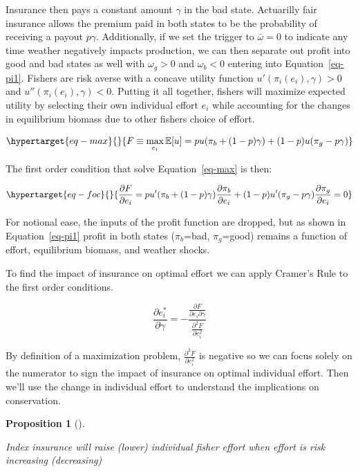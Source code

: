 \documentclass[
  letterpaper,
  DIV=11,
  numbers=noendperiod]{scrartcl}
\theoremstyle{plain}
\theoremstyle{plain}
\newtheorem{proposition}{Proposition}[section]
\theoremstyle{remark}
\begin{document}
Insurance then pays a constant amount \(\gamma\) in the bad state.
Actuarilly fair insurance allows the premium paid in both states to be
the probability of receiving a payout \(p\gamma\). Additionally, if we
set the trigger to \(\bar\omega=0\) to indicate any time weather
negatively impacts production, we can then separate out profit into good
and bad states as well with \(\omega_g>0\) and \(\omega_b<0\) entering
into Equation~\ref{eq-pi1}. Fishers are risk averse with a concave
utility function \(u'(\pi_i(e_i),\gamma)>0\) and
\(u''(\pi_i(e_i),\gamma)<0\). Putting it all together, fishers will
maximize expected utility by selecting their own individual effort
\(e_i\) while accounting for the changes in equilibrium biomass due to
other fishers choice of effort.

\begin{equation}\protect\hypertarget{eq-max}{}{
F\equiv\max_{e_i}\mathbb{E}[u]=pu(\pi_b+(1-p)\gamma)+(1-p)u(\pi_g-p\gamma)
}\label{eq-max}\end{equation}

The first order condition that solve Equation~\ref{eq-max} is then:

\begin{equation}\protect\hypertarget{eq-foc}{}{
\frac{\partial F}{\partial e_i}=pu'(\pi_b+(1-p)\gamma)\frac{\partial \pi_b}{\partial e_i}+(1-p)u'(\pi_g-p\gamma)\frac{\partial \pi_g}{\partial e_i}=0
}\label{eq-foc}\end{equation}

For notional ease, the inputs of the profit function are dropped, but as
shown in Equation~\ref{eq-pi1} profit in both states (\(\pi_b\)=bad,
\(\pi_g\)=good) remains a function of effort, equilibrium biomass, and
weather shocks.

To find the impact of insurance on optimal effort we can apply Cramer's
Rule to the first order conditions.

\[
\frac{\partial e_i^*}{\partial \gamma}=-\frac{\frac{\partial F}{\partial e_i \partial \gamma}}{\frac{\partial^2 F}{\partial e_i^2}}
\]

By definition of a maximization problem,
\(\frac{\partial^2 F}{\partial e_i^2}\) is negative so we can focus
solely on the numerator to sign the impact of insurance on optimal
individual effort. Then we'll use the change in individual effort to
understand the implications on conservation.

\begin{proposition}[]\protect\hypertarget{prp-cp}{}\label{prp-cp}

Index insurance will raise (lower) individual fisher effort when effort
is risk increasing (decreasing)

\end{proposition}
\end{document}
